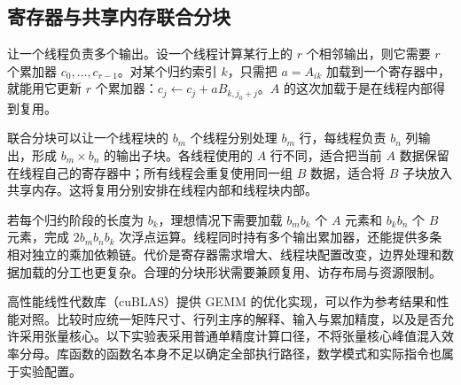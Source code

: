 \subsection{寄存器与共享内存联合分块}

让一个线程负责多个输出。设一个线程计算某行上的 $r$ 个相邻输出，则它需要 $r$ 个累加器 $c_0,\ldots,c_{r-1}$。对某个归约索引 $k$，只需把 $a=A_{ik}$ 加载到一个寄存器中，就能用它更新 $r$ 个累加器：$c_j\leftarrow c_j+aB_{k,j_0+j}$。$A$ 的这次加载于是在线程内部得到复用。

联合分块可以让一个线程块的 $b_m$ 个线程分别处理 $b_m$ 行，每线程负责 $b_n$ 列输出，形成 $b_m\times b_n$ 的输出子块。各线程使用的 $A$ 行不同，适合把当前 $A$ 数据保留在线程自己的寄存器中；所有线程会重复使用同一组 $B$ 数据，适合将 $B$ 子块放入共享内存。这将复用分别安排在线程内部和线程块内部。

若每个归约阶段的长度为 $b_k$，理想情况下需要加载 $b_mb_k$ 个 $A$ 元素和 $b_kb_n$ 个 $B$ 元素，完成 $2b_mb_nb_k$ 次浮点运算。线程同时持有多个输出累加器，还能提供多条相对独立的乘加依赖链。代价是寄存器需求增大、线程块配置改变，边界处理和数据加载的分工也更复杂。合理的分块形状需要兼顾复用、访存布局与资源限制。

高性能线性代数库（cuBLAS）提供 GEMM 的优化实现，可以作为参考结果和性能对照。比较时应统一矩阵尺寸、行列主序的解释、输入与累加精度，以及是否允许采用张量核心。以下实验表采用普通单精度计算口径，不将张量核心峰值混入效率分母。库函数的函数名本身不足以确定全部执行路径，数学模式和实际指令也属于实验配置。
